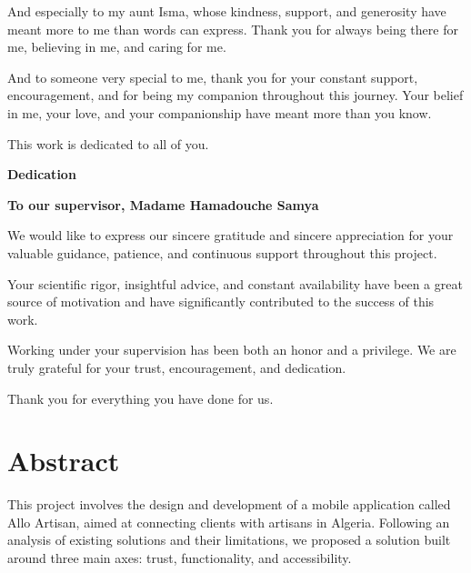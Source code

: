 \documentclass[12pt,a4paper]{report}
\begin{document}
\vspace{0.3cm}

And especially to my aunt Isma, whose kindness, support, and generosity have meant more to me than words can express. Thank you for always being there for me, believing in me, and caring for me.

\vspace{0.3cm}

And to someone very special to me, thank you for your constant support, encouragement, and for being my companion throughout this journey. Your belief in me, your love, and your companionship have meant more than you know.

\vspace{0.3cm}

This work is dedicated to all of you.
\newpage
\thispagestyle{fancy}

\begin{center}
    {\Large \textbf{Dedication}}
\end{center}

\vspace{0.8cm}

\textbf{To our supervisor, Madame Hamadouche Samya}

\vspace{0.3cm}

We would like to express our sincere gratitude and sincere appreciation for your valuable guidance, patience, and continuous support throughout this project.

Your scientific rigor, insightful advice, and constant availability have been a great source of motivation and have significantly contributed to the success of this work.

Working under your supervision has been both an honor and a privilege. We are truly grateful for your trust, encouragement, and dedication.

\vspace{0.3cm}

Thank you for everything you have done for us.
\chapter*{Abstract}

This project involves the design and development of a mobile application called Allo Artisan, aimed at connecting clients with artisans in Algeria. Following an analysis of existing solutions and their limitations, we proposed a solution built around three main axes: trust, functionality, and accessibility.
\end{document}
